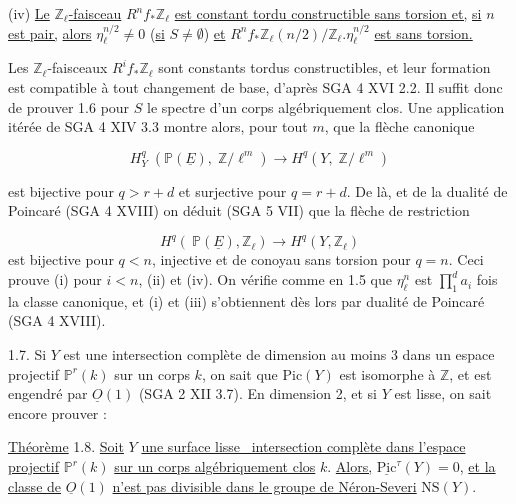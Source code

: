 (iv) \underline{Le} $\mathbb{Z}_\ell$\underline{-faisceau} $R^n f_* \mathbb{Z}_\ell$ \underline{est constant tordu constructible sans torsion et,} \underline{si} $n$ \underline{est pair,} \underline{alors} $\eta_\ell^{n/2} \neq 0$ (\underline{si} $S \neq \emptyset$) \underline{et} $R^n f_* \mathbb{Z}_\ell(n/2)/ \mathbb{Z}_\ell . \eta_\ell^{n/2}$ \underline{est sans torsion.}

Les $\mathbb{Z}_\ell$-faisceaux $R^i f_* \mathbb{Z}_\ell$ sont constants tordus constructibles, et leur formation est compatible à tout changement de base, d'après SGA 4 XVI 2.2. Il suffit donc de prouver 1.6 pour $S$ le spectre d'un corps algébriquement clos. Une application itérée de SGA 4 XIV 3.3 montre alors, pour tout $m$, que la flèche canonique

\begin{equation*}
H^q_Y \; (\mathbb{P}(\underline{E}), \; \mathbb{Z}/\ell^m) \longrightarrow H^q(Y, \; \mathbb{Z}/\ell^m)
\end{equation*}

est bijective pour $q > r + d$ et surjective pour $q = r + d$. De là, et de la dualité de Poincaré (SGA 4 XVIII) on déduit (SGA 5 VII) que la flèche de restriction

\begin{equation*}
H^q(\ \mathbb{P}(\underline{E}), \mathbb{Z}_\ell) \longrightarrow H^q(Y, \mathbb{Z}_\ell)
\end{equation*}
est bijective pour $q < n$, injective et de conoyau sans torsion pour $q = n$. Ceci prouve (i) pour $i < n$, (ii) et (iv). On vérifie comme en 1.5 que $\eta_\ell^n$ est $\prod_1^d a_i$ fois la classe canonique, et (i) et (iii) s'obtiennent dès lors par dualité de Poincaré (SGA 4 XVIII).

1.7. Si $Y$ est une intersection complète de dimension au moins 3 dans un espace projectif $\mathbb{P}^r(k)$ sur un corps $k$, on sait que $\mathrm{Pic}(Y)$ est isomorphe à $\mathbb{Z}$, et est engendré par $\underline{O}(1)$ (SGA 2 XII 3.7). En dimension 2, et si $Y$ est lisse, on sait encore prouver :

\underline{Théorème} 1.8. \underline{Soit} $Y$ \underline{une surface lisse \ intersection complète dans l'espace projectif} $\mathbb{P}^r(k)$ \underline{sur un corps algébriquement clos} $k$. \underline{Alors,} $\underline{\mathrm{Pic}}^\tau(Y) = 0$, \underline{et la classe de} $\underline{O}(1)$ \underline{n'est pas divisible dans le groupe de Néron-Severi} $\mathrm{NS}(Y)$.

